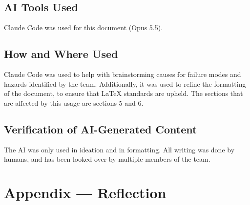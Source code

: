 \documentclass{article}
\begin{document}
\subsection{AI Tools Used}

Claude Code was used for this document (Opus 5.5).

\subsection{How and Where Used}

Claude Code was used to help with brainstorming causes for failure modes and hazards identified by the team.
Additionally, it was used to refine the formatting of the document, to ensure that LaTeX standards are upheld.
The sections that are affected by this usage are sections 5 and 6.

\subsection{Verification of AI-Generated Content}

The AI was only used in ideation and in formatting.
All writing was done by humans, and has been looked over by multiple members of the team.

\newpage{}

\section{Appendix --- Reflection}


\end{document}
